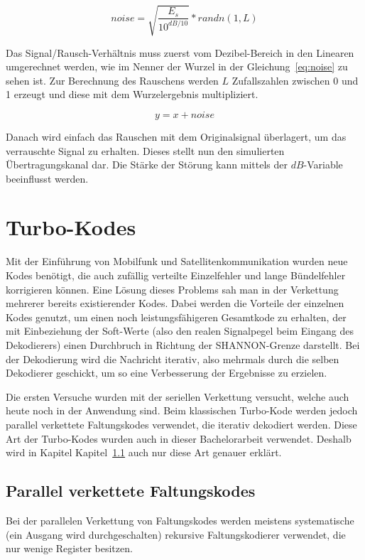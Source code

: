 \begin{equation}
noise = \sqrt{\frac{E_s}{10^{dB/10}}} * randn(1,L)
\label{eq:noise}
\end{equation}

Das Signal/Rausch-Verhältnis muss zuerst vom Dezibel-Bereich in den Linearen umgerechnet werden, wie im Nenner der Wurzel in der Gleichung~\ref{eq:noise} zu sehen ist.
Zur Berechnung des Rauschens werden $L$ Zufallszahlen zwischen 0 und 1 erzeugt und diese mit dem Wurzelergebnis multipliziert. 

\begin{equation}
y = x + noise
\label{eq:noisySignal}
\end{equation}

Danach wird einfach das Rauschen mit dem Originalsignal überlagert, um das verrauschte Signal zu erhalten. Dieses stellt nun den simulierten Übertragungskanal dar. Die Stärke der Störung kann mittels der $dB$-Variable beeinflusst werden.~\cite{AWGN}

\section{Turbo-Kodes}
\label{sec:turboCodes}
Mit der Einführung von Mobilfunk und Satellitenkommunikation wurden neue Kodes benötigt, die auch zufällig verteilte Einzelfehler und lange Bündelfehler korrigieren können. Eine Lösung dieses Problems sah man in der Verkettung mehrerer bereits existierender Kodes. Dabei werden die Vorteile der einzelnen Kodes genutzt, um einen noch leistungsfähigeren Gesamtkode zu erhalten, der mit Einbeziehung der Soft-Werte (also den realen Signalpegel beim Eingang des Dekodierers) einen Durchbruch in Richtung der SHANNON-Grenze darstellt. Bei der Dekodierung wird die Nachricht iterativ, also mehrmals durch die selben Dekodierer geschickt, um so eine Verbesserung der Ergebnisse zu erzielen.~\cite[S.~242~f.]{schoenfeld2012informations}

Die ersten Versuche wurden mit der seriellen Verkettung versucht, welche auch heute noch in der Anwendung sind. Beim klassischen Turbo-Kode werden jedoch parallel verkettete Faltungskodes verwendet, die iterativ dekodiert werden. Diese Art der Turbo-Kodes wurden auch in dieser Bachelorarbeit verwendet. Deshalb wird in Kapitel Kapitel~\ref{sec:parallelConvCodes} auch nur diese Art genauer erklärt.

\subsection{Parallel verkettete Faltungskodes} 
\label{sec:parallelConvCodes}
Bei der parallelen Verkettung von Faltungskodes werden meistens systematische (ein Ausgang wird durchgeschalten) rekursive Faltungskodierer verwendet, die nur wenige Register besitzen.


